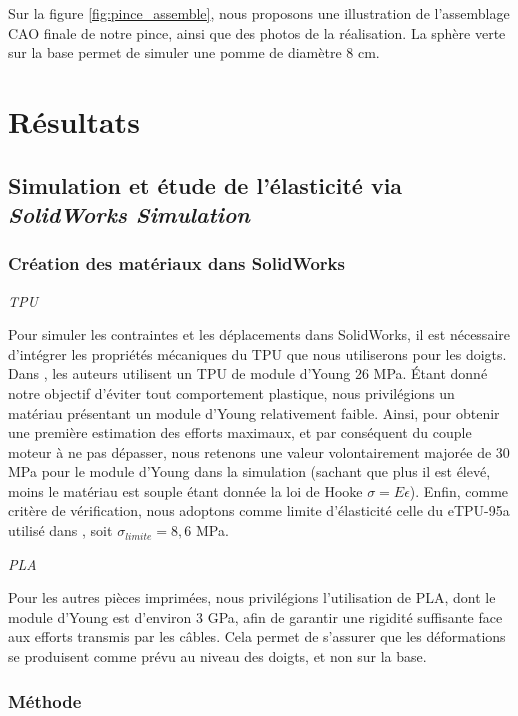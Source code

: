 \documentclass[a4paper, 11pt]{report}
\begin{document}
            Sur la figure \ref{fig:pince_assemble}, nous proposons une illustration de l'assemblage CAO finale de notre pince, ainsi que des photos de la réalisation. La sphère verte sur la base permet de simuler une pomme de diamètre 8 cm.

\clearpage

\section{Résultats}

    \subsection{Simulation et étude de l'élasticité via \textit{SolidWorks Simulation}}

        \subsubsection{Création des matériaux dans SolidWorks}

            \textit{TPU}

                Pour simuler les contraintes et les déplacements dans SolidWorks, il est nécessaire d'intégrer les propriétés mécaniques du TPU que nous utiliserons pour les doigts. Dans \cite{rodriguez-parada_influence_2021}, les auteurs utilisent un TPU de module d'Young 26 MPa. Étant donné notre objectif d’éviter tout comportement plastique, nous privilégions un matériau présentant un module d’Young relativement faible. Ainsi, pour obtenir une première estimation des efforts maximaux, et par conséquent du couple moteur à ne pas dépasser, nous retenons une valeur volontairement majorée de 30 MPa pour le module d’Young dans la simulation (sachant que plus il est élevé, moins le matériau est souple étant donnée la loi de Hooke $\sigma = E \epsilon$). Enfin, comme critère de vérification, nous adoptons comme limite d’élasticité celle du eTPU-95a utilisé dans \cite{wang_spirobs_2025}, soit $\sigma_{limite} = 8,6$ MPa.
            
            \textit{PLA}

                Pour les autres pièces imprimées, nous privilégions l'utilisation de PLA, dont le module d'Young est d’environ 3 GPa, afin de garantir une rigidité suffisante face aux efforts transmis par les câbles. Cela permet de s’assurer que les déformations se produisent comme prévu au niveau des doigts, et non sur la base.

        \subsubsection{Méthode}
\end{document}
